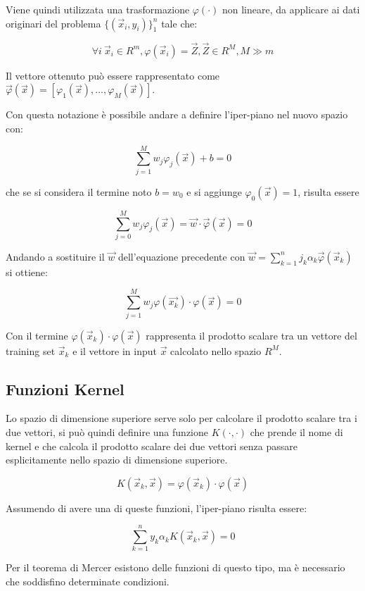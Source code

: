 Viene quindi utilizzata una trasformazione $\varphi(\cdot)$ non lineare, da applicare ai dati originari del problema $\{(\vec{x}_i, y_i)\}_1^n$ tale che:

$$ \forall i \: \vec{x}_i \in R^m, \varphi(\vec{x}_i) = \vec{Z}, \vec{Z} \in R^M, M \gg m $$

Il vettore ottenuto può essere rappresentato come $\vec{\varphi}(\vec{x}) = [ \varphi_1(\vec{x}), \ldots , \varphi_M(\vec{x}) ] $.

Con questa notazione è possibile andare a definire l'iper-piano nel nuovo spazio con:

$$ \sum\limits_{j=1}^M w_j \varphi_j(\vec{x}) + b = 0$$

che se si considera il termine noto $b = w_0$ e si aggiunge $\varphi_0(\vec{x}) = 1$, risulta essere

$$ \sum\limits_{j=0}^M w_j \varphi_j(\vec{x}) = \vec{w} \cdot \vec{\varphi}(\vec{x}) = 0$$

Andando a sostituire il $\vec{w}$ dell'equazione precedente con $ \vec{w} = \sum\limits_{k=1}^n j_k \alpha_k \vec{\varphi}(\vec{x}_k)$ si ottiene:

$$ \sum\limits_{j=1}^M w_j \varphi(\vec{x_k}) \cdot \varphi(\vec{x}) = 0 $$

Con il termine $\varphi(\vec{x}_k) \cdot \varphi(\vec{x})$ rappresenta il prodotto scalare tra un vettore del training set $\vec{x}_k$ e il vettore in input $\vec{x}$ calcolato nello spazio $R^M$.

\subsection{Funzioni Kernel}\label{funzioni-kernel}

Lo spazio di dimensione superiore serve solo per calcolare il prodotto scalare tra i due vettori, si può quindi definire una funzione $K(\cdot, \cdot)$ che prende il nome di kernel e che calcola il prodotto scalare dei due vettori senza passare esplicitamente nello spazio di dimensione superiore.

$$ K(\vec{x}_k, \vec{x}) = \varphi(\vec{x}_k) \cdot \varphi(\vec{x})$$

Assumendo di avere una di queste funzioni, l'iper-piano risulta essere:

$$\sum\limits_{k=1}^n  y_k \alpha_k K(\vec{x}_k, \vec{x}) = 0$$

Per il teorema di Mercer esistono delle funzioni di questo tipo, ma è necessario che soddisfino determinate condizioni.

